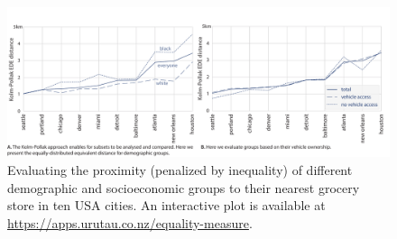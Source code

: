 \documentclass[final,3p,times,onecolumn,sort&compress]{elsarticle}
\begin{document}
\begin{figure}
    \includegraphics[width=\linewidth]{report/fig/fig4.pdf}
    \caption{
    Evaluating the proximity (penalized by inequality) of different demographic and socioeconomic groups to their nearest grocery store in ten USA cities. 
    An interactive plot is available at \url{https://apps.urutau.co.nz/equality-measure}.
    }
    \label{fig:subgroup}
\end{figure}
\end{document}
